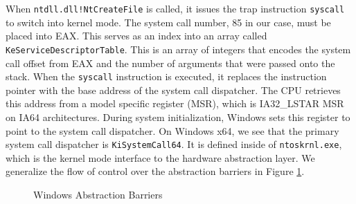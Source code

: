 \documentclass[preprint,12pt]{elsarticle}
\begin{document}
When \texttt{ntdll.dll!NtCreateFile} is called, it issues the trap instruction \texttt{syscall} to switch into kernel mode. The system call number, 85 in our case, must be placed into EAX. This serves as an index into an array called \texttt{KeServiceDescriptorTable}. This is an array of integers that encodes the system call offset from EAX and the number of arguments that were passed onto the stack. When the \texttt{syscall} instruction is executed, it replaces the instruction pointer with the base address of the system call dispatcher. The CPU retrieves this address from a model specific register (MSR), which is IA32\_LSTAR MSR on IA64 architectures. During system initialization, Windows sets this register to point to the system call dispatcher. On Windows x64, we see that the primary system call dispatcher is \texttt{KiSystemCall64}. It is defined inside of \texttt{ntoskrnl.exe}, which is the kernel mode interface to the hardware abstraction layer. We generalize the flow of control over the abstraction barriers in Figure \ref{fig:abstraction}.

\begin{figure}[ht]
\centering{}
\caption{Windows Abstraction Barriers}
\label{fig:abstraction}
\end{figure}
\end{document}
